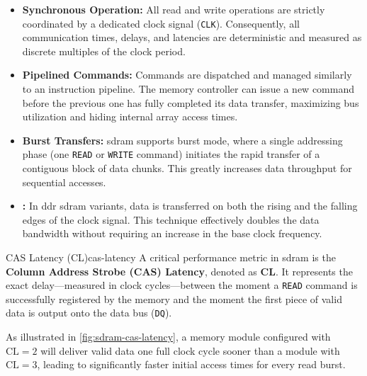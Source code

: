 \begin{itemize}
    \item \textbf{Synchronous Operation:} All read and write operations are strictly coordinated by a dedicated clock signal (\texttt{CLK}). Consequently, all communication times, delays, and latencies are deterministic and measured as discrete multiples of the clock period.
    \item \textbf{Pipelined Commands:} Commands are dispatched and managed similarly to an instruction pipeline. The memory controller can issue a new command before the previous one has fully completed its data transfer, maximizing bus utilization and hiding internal array access times.
    \item \textbf{Burst Transfers:} \gls{sdram} supports burst mode, where a single addressing phase (one \texttt{READ} or \texttt{WRITE} command) initiates the rapid transfer of a contiguous block of data chunks. This greatly increases data throughput for sequential accesses.
    \item \textbf{:} In \gls{ddr} \gls{sdram} variants, data is transferred on both the rising and the falling edges of the clock signal. This technique effectively doubles the data bandwidth without requiring an increase in the base clock frequency.
\end{itemize}

\begin{concept}{CAS Latency (CL)}{cas-latency}
    A critical performance metric in \gls{sdram} is the \textbf{Column Address Strobe (CAS) Latency}, denoted as \textbf{CL}. It represents the exact delay—measured in clock cycles—between the moment a \texttt{READ} command is successfully registered by the memory and the moment the first piece of valid data is output onto the data bus (\texttt{DQ}). 
    
    As illustrated in \cref{fig:sdram-cas-latency}, a memory module configured with $\text{CL} = 2$ will deliver valid data one full clock cycle sooner than a module with $\text{CL} = 3$, leading to significantly faster initial access times for every read burst.
\end{concept}

